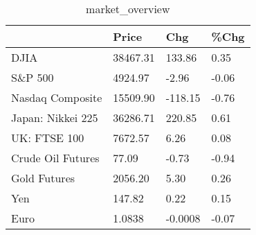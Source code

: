 \documentclass{article}%
\begin{document}
%


\begin{table}[htbp]%
\caption{market\_overview}%
\centering%
\begin{adjustbox}{width=1\textwidth}%
\begin{tabular}{llll}
\toprule
                  &    Price &     Chg &  \%Chg \\
\midrule
             DJIA & 38467.31 &  133.86 &  0.35 \\
          S\&P 500 &  4924.97 &   -2.96 & -0.06 \\
 Nasdaq Composite & 15509.90 & -118.15 & -0.76 \\
Japan: Nikkei 225 & 36286.71 &  220.85 &  0.61 \\
     UK: FTSE 100 &  7672.57 &    6.26 &  0.08 \\
Crude Oil Futures &    77.09 &   -0.73 & -0.94 \\
     Gold Futures &  2056.20 &    5.30 &  0.26 \\
              Yen &   147.82 &    0.22 &  0.15 \\
             Euro &   1.0838 & -0.0008 & -0.07 \\
\bottomrule
\end{tabular}
%
\end{adjustbox}%
\end{table}

%
\end{document}
